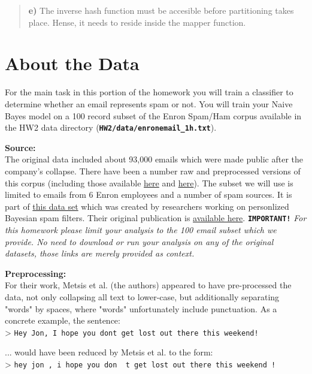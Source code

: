 \documentclass[11pt]{article}
\begin{document}
\begin{quote}
\textbf{e)} The inverse hash function must be accesible before
partitioning takes place. Hense, it needs to reside inside the mapper
function.
\end{quote}

    \section{About the Data}\label{about-the-data}

For the main task in this portion of the homework you will train a
classifier to determine whether an email represents spam or not. You
will train your Naive Bayes model on a 100 record subset of the Enron
Spam/Ham corpus available in the HW2 data directory
(\textbf{\texttt{HW2/data/enronemail\_1h.txt}}).

\textbf{Source:}\\
The original data included about 93,000 emails which were made public
after the company's collapse. There have been a number raw and
preprocessed versions of this corpus (including those available
\href{http://www.aueb.gr/users/ion/data/enron-spam/index.html}{here} and
\href{http://www.aueb.gr/users/ion/publications.html}{here}). The subset
we will use is limited to emails from 6 Enron employees and a number of
spam sources. It is part of
\href{http://www.aueb.gr/users/ion/data/enron-spam/}{this data set}
which was created by researchers working on personlized Bayesian spam
filters. Their original publication is
\href{http://www.aueb.gr/users/ion/docs/ceas2006_paper.pdf}{available
here}. \textbf{\texttt{IMPORTANT!}} \emph{For this homework please limit
your analysis to the 100 email subset which we provide. No need to
download or run your analysis on any of the original datasets, those
links are merely provided as context.}

\textbf{Preprocessing:}\\
For their work, Metsis et al. (the authors) appeared to have
pre-processed the data, not only collapsing all text to lower-case, but
additionally separating "words" by spaces, where "words" unfortunately
include punctuation. As a concrete example, the sentence:\\
\textgreater{}
\texttt{Hey\ Jon,\ I\ hope\ you\ don\textquotesingle{}t\ get\ lost\ out\ there\ this\ weekend!}

... would have been reduced by Metsis et al. to the form:\\
\textgreater{}
\texttt{hey\ jon\ ,\ i\ hope\ you\ don\ \textquotesingle{}\ t\ get\ lost\ out\ there\ this\ weekend\ !}
\end{document}
